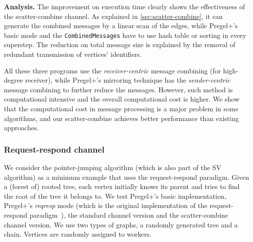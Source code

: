 \documentclass{sokendai_thesis} %
\newcommand{\PP}{Pregel+}
\begin{document}
\textbf{Analysis.}
The improvement on execution time clearly shows the effectiveness of the scatter-combine channel.
As explained in \autoref{sec:scatter-combine}, it can generate the combined messages by a linear scan of the edges, while \PP{}'s basic mode and the \texttt{CombinedMessages} have to use hash table or sorting in every superstep.
The reduction on total message size is explained by the removal of redundant transmission of vertices' identifiers.

All these three programs use the \textit{receiver-centric} message combining (for high-degree receiver), while \PP{}'s mirroring technique has the \textit{sender-centric} message combining to further reduce the messages.
However, such method is computational intensive and the overall computational cost is higher.
We show that the computational cost in message processing is a major problem in some algorithms, and our scatter-combine achieves better performance than existing approaches.

\subsubsection{Request-respond channel}
\label{sec:eval-rr}

We consider the pointer-jumping algorithm (which is also part of the SV algorithm) as a minimum example that uses the request-respond paradigm.
Given a (forest of) rooted tree, each vertex initially knows its parent and tries to find the root of the tree it belongs to.
We test \PP{}'s basic implementation, \PP{}'s \textit{reqresp} mode (which is the original implementation of the request-respond paradigm~\cite{yan2015effective}), the standard channel version and the scatter-combine channel version.
We use two types of graphs, a randomly generated tree and a chain.
Vertices are randomly assigned to workers.

\end{document}
